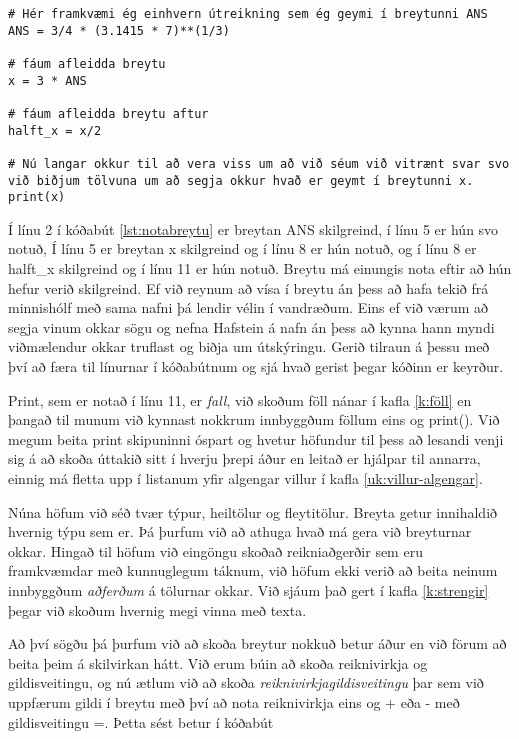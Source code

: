 \begin{lstlisting}[caption=Að nota breytu, label=lst:notabreytu]
# Hér framkvæmi ég einhvern útreikning sem ég geymi í breytunni ANS
ANS = 3/4 * (3.1415 * 7)**(1/3)

# fáum afleidda breytu
x = 3 * ANS

# fáum afleidda breytu aftur
halft_x = x/2

# Nú langar okkur til að vera viss um að við séum við vitrænt svar svo við biðjum tölvuna um að segja okkur hvað er geymt í breytunni x.
print(x)
\end{lstlisting}
Í línu 2 í kóðabút \ref{lst:notabreytu} er breytan ANS skilgreind, í línu 5 er hún svo notuð,
Í línu 5 er breytan x skilgreind og í línu 8 er hún notuð, og í línu 8 er halft\_x skilgreind og í línu 11 er hún notuð.
Breytu má einungis nota eftir að hún hefur verið skilgreind.
Ef við reynum að vísa í breytu án þess að hafa tekið frá minnishólf með sama nafni þá lendir vélin í vandræðum.
Eins ef við værum að segja vinum okkar sögu og nefna Hafstein á nafn án þess að kynna hann myndi viðmælendur okkar truflast og biðja um útskýringu.
Gerið tilraun á þessu með því að færa til línurnar í kóðabútnum og sjá hvað gerist þegar kóðinn er keyrður.


Print, sem er notað í línu 11, er \textit{fall}, við skoðum föll nánar í kafla \ref{k:föll} en þangað til munum við kynnast nokkrum innbyggðum föllum eins og print().
Við megum beita print skipuninni óspart og hvetur höfundur til þess að lesandi venji sig á að skoða úttakið sitt í hverju þrepi áður en leitað er hjálpar til annarra, einnig má fletta upp í listanum yfir algengar villur í kafla \ref{uk:villur-algengar}.


Núna höfum við séð tvær týpur, heiltölur og fleytitölur.
Breyta getur innihaldið hvernig týpu sem er.
Þá þurfum við að athuga hvað má gera við breyturnar okkar.
Hingað til höfum við eingöngu skoðað reikniaðgerðir sem eru framkvæmdar með kunnuglegum táknum, við höfum ekki verið að beita neinum innbyggðum \textit{aðferðum} á tölurnar okkar.
Við sjáum það gert í kafla \ref{k:strengir} þegar við skoðum hvernig megi vinna með texta.

Að því sögðu þá þurfum við að skoða breytur nokkuð betur áður en við förum að beita þeim á skilvirkan hátt.
Við erum búin að skoða reiknivirkja og gildisveitingu, og nú ætlum við að skoða \textit{reiknivirkjagildisveitingu} þar sem við uppfærum gildi í breytu með því að nota reiknivirkja eins og + eða - með gildisveitingu =.
Þetta sést betur í kóðabút


